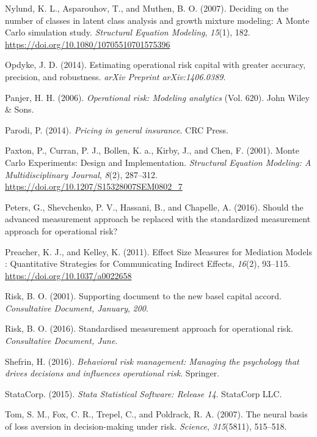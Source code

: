 \documentclass[]{DissertateUSU}
\begin{document}
\hypertarget{ref-Nylund2007}{}
Nylund, K. L., Asparouhov, T., and Muthen, B. O. (2007). Deciding on the
number of classes in latent class analysis and growth mixture modeling:
A Monte Carlo simulation study. \emph{Structural Equation Modeling},
\emph{15}(1), 182. \url{https://doi.org/10.1080/10705510701575396}

\hypertarget{ref-opdyke2014estimating}{}
Opdyke, J. D. (2014). Estimating operational risk capital with greater
accuracy, precision, and robustness. \emph{arXiv Preprint
arXiv:1406.0389}.

\hypertarget{ref-panjer2006operational}{}
Panjer, H. H. (2006). \emph{Operational risk: Modeling analytics} (Vol.
620). John Wiley \& Sons.

\hypertarget{ref-parodi2014pricing}{}
Parodi, P. (2014). \emph{Pricing in general insurance}. CRC Press.

\hypertarget{ref-Paxton2001}{}
Paxton, P., Curran, P. J., Bollen, K. a., Kirby, J., and Chen, F.
(2001). Monte Carlo Experiments: Design and Implementation.
\emph{Structural Equation Modeling: A Multidisciplinary Journal},
\emph{8}(2), 287--312. \url{https://doi.org/10.1207/S15328007SEM0802_7}

\hypertarget{ref-peters2016should}{}
Peters, G., Shevchenko, P. V., Hassani, B., and Chapelle, A. (2016).
Should the advanced measurement approach be replaced with the
standardized measurement approach for operational risk?

\hypertarget{ref-Preacher2011}{}
Preacher, K. J., and Kelley, K. (2011). Effect Size Measures for
Mediation Models : Quantitative Strategies for Communicating Indirect
Effects, \emph{16}(2), 93--115. \url{https://doi.org/10.1037/a0022658}

\hypertarget{ref-risk2001supporting}{}
Risk, B. O. (2001). Supporting document to the new basel capital accord.
\emph{Consultative Document, January}, \emph{200}.

\hypertarget{ref-risk2016supporting}{}
Risk, B. O. (2016). Standardised measurement approach for operational
risk. \emph{Consultative Document, June}.

\hypertarget{ref-shefrin2016behavioral}{}
Shefrin, H. (2016). \emph{Behavioral risk management: Managing the
psychology that drives decisions and influences operational risk}.
Springer.

\hypertarget{ref-Stata14}{}
StataCorp. (2015). \emph{Stata Statistical Software: Release 14}.
StataCorp LLC.

\hypertarget{ref-tom2007neural}{}
Tom, S. M., Fox, C. R., Trepel, C., and Poldrack, R. A. (2007). The
neural basis of loss aversion in decision-making under risk.
\emph{Science}, \emph{315}(5811), 515--518.
\end{document}
